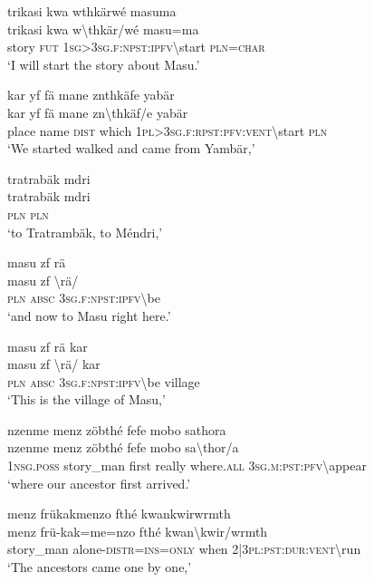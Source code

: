 \ea\label{ex:2:a1608}
trikasi kwa wthkärwé masuma\\
\gll trikasi	kwa	w{\textbackslash}thkär/wé	masu=ma\\
     story	\textsc{fut}	1\textsc{sg}>3\textsc{sg}.\textsc{f}:\textsc{npst}:\textsc{ipfv}{\textbackslash}start	\textsc{pln}=\textsc{char}\\
\glt `I will start the story about Masu.'
\z

\ea\label{ex:2:a1609}
kar yf fä mane znthkäfe yabär\\
\gll kar	yf	fä	mane	zn{\textbackslash}thkäf/e	yabär\\
     place	name	\textsc{dist}	which	1\textsc{pl}>3\textsc{sg}.\textsc{f}:\textsc{rpst}:\textsc{pfv}:\textsc{vent}{\textbackslash}start	\textsc{pln}\\
\glt `We started walked and came from Yambär,'
\z

\ea\label{ex:2:a1610}
tratrabäk mdri\\
\gll tratrabäk	mdri\\
     \textsc{pln}	\textsc{pln}\\
\glt `to Tratrambäk, to Méndri,'
\z

\ea\label{ex:2:a1611}
masu zf rä\\
\gll masu	zf	{\textbackslash}rä/\\
     \textsc{pln}	\textsc{absc}	3\textsc{sg}.\textsc{f}:\textsc{npst}:\textsc{ipfv}{\textbackslash}be\\
\glt `and now to Masu right here.'
\z

\ea\label{ex:2:a1612}
masu zf rä kar\\
\gll masu	zf	{\textbackslash}rä/	kar\\
     \textsc{pln}	\textsc{absc}	3\textsc{sg}.\textsc{f}:\textsc{npst}:\textsc{ipfv}{\textbackslash}be	village\\
\glt `This is the village of Masu,'
\z

\ea\label{ex:2:a1613}
nzenme menz zöbthé fefe mobo sathora\\
\gll nzenme	menz	zöbthé	fefe	mobo	sa{\textbackslash}thor/a\\
     1\textsc{nsg}.\textsc{poss}	story\_man	first	really	where.\textsc{all}	3\textsc{sg}.\textsc{m}:\textsc{pst}:\textsc{pfv}{\textbackslash}appear\\
\glt `where our ancestor first arrived.'
\z

\ea\label{ex:2:a1614}
menz frükakmenzo fthé kwankwirwrmth\\
\gll menz	frü-kak=me=nzo	fthé	kwan{\textbackslash}kwir/wrmth\\
     story\_man	alone-\textsc{distr}=\textsc{ins}=\textsc{only}	when	2|3\textsc{pl}:\textsc{pst}:\textsc{dur}:\textsc{vent}{\textbackslash}run\\
\glt `The ancestors came one by one,'
\z

